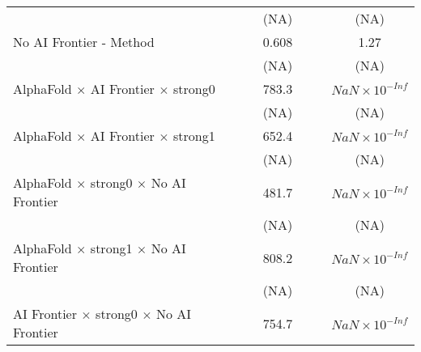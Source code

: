 \begin{tabular}{lcccccc}
                                                                              &                        &        & (NA)   &                        &                        & (NA)\\   
   No AI Frontier - Method                                                    &                        &        & 0.608  &                        &                        & 1.27\\   
                                                                              &                        &        & (NA)   &                        &                        & (NA)\\   
   AlphaFold $\times$ AI Frontier $\times$ strong0                            &                        &        & 783.3  &                        &                        & $NaN\times 10^{-Inf}$\\    
                                                                              &                        &        & (NA)   &                        &                        & (NA)\\   
   AlphaFold $\times$ AI Frontier $\times$ strong1                            &                        &        & 652.4  &                        &                        & $NaN\times 10^{-Inf}$\\    
                                                                              &                        &        & (NA)   &                        &                        & (NA)\\   
   AlphaFold $\times$ strong0 $\times$ No AI Frontier                         &                        &        & 481.7  &                        &                        & $NaN\times 10^{-Inf}$\\    
                                                                              &                        &        & (NA)   &                        &                        & (NA)\\   
   AlphaFold $\times$ strong1 $\times$ No AI Frontier                         &                        &        & 808.2  &                        &                        & $NaN\times 10^{-Inf}$\\    
                                                                              &                        &        & (NA)   &                        &                        & (NA)\\   
   AI Frontier $\times$ strong0 $\times$ No AI Frontier                       &                        &        & 754.7  &                        &                        & $NaN\times 10^{-Inf}$\\    

\end{tabular}
